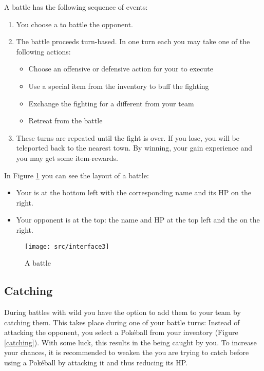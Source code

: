 A battle has the following sequence of events:
\begin{enumerate}
\item You choose a \poke{} to battle the opponent.
\item The battle proceeds turn-based. In one turn each you may take one of the following actions:
\begin{itemize}
\item Choose an offensive or defensive action for your \poke{} to execute
\item Use a special item from the inventory to buff the fighting \poke{}
\item Exchange the fighting \poke{} for a different \poke{} from your team
\item Retreat from the battle
\end{itemize}
\item These turns are repeated until the fight is over. If you lose, you will be teleported back to the nearest town. By winning, your \poke{} gain experience and you may get some item-rewards.
\end{enumerate}

In Figure \ref{battle} you can see the layout of a battle:
\begin{itemize}
\item Your \poke{} is at the bottom left with the corresponding name and its HP on the right.
\item Your opponent is at the top: the name and HP at the top left and the \poke{} on the right.
\end{itemize}

\begin{figure}[!ht]
\begin{center}
\texttt{[image: src/interface3]}
\end{center}
\caption[A \pokeT{} battle]{A \poke{} battle}
\label{battle}
\end{figure}

\newpage

\subsection[Catching \pokeT{}]{Catching \poke{}}
During battles with wild \poke{} you have the option to add them to your team by catching them. This takes place during one of your battle turns: Instead of attacking the opponent, you select a Pokéball from your inventory (Figure \ref{catching}). With some luck, this results in the \poke{} being caught by you. To increase your chances, it is recommended to weaken the \poke{} you are trying to catch before using a Pokéball by attacking it and thus reducing its HP.

